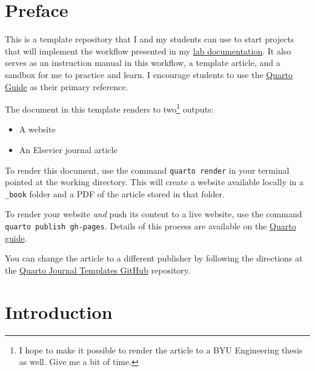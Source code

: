 \documentclass[
  letterpaper,
  authoryear]{elsarticle}
\begin{document}

\section*{Preface}\label{preface}


This is a template repository that I and my students can use to start
projects that will implement the workflow presented in my
\href{https://gregmacfarlane.github.io/lab/workflow.html}{lab
documentation}. It also serves as an instruction manual in this
workflow, a template article, and a sandbox for me to practice and
learn. I encourage students to use the
\href{https://quarto.org/docs/guide/}{Quarto Guide} as their primary
reference.

The document in this template renders to two\footnote{I hope to make it
  possible to render the article to a BYU Engineering thesis as well.
  Give me a bit of time.} outputs:

\begin{itemize}
\item
  A website
\item
  An Elsevier journal article
\end{itemize}

To render this document, use the command \texttt{quarto\ render} in your
terminal pointed at the working directory. This will create a website
available locally in a \texttt{\_book} folder and a PDF of the article
stored in that folder.

To render your website \emph{and} push its content to a live website,
use the command \texttt{quarto\ publish\ gh-pages}. Details of this
process are available on the
\href{https://quarto.org/docs/publishing/github-pages.html\#publish-command}{Quarto
guide}.

You can change the article to a different publisher by following the
directions at the \href{https://github.com/quarto-journals}{Quarto
Journal Templates GitHub} repository.


\section{Introduction}\label{introduction}
\end{document}
